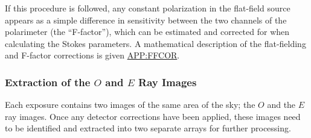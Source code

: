 If this procedure is followed, any constant polarization in the
flat-field source appears as a simple difference in sensitivity between
the two channels of the polarimeter (the ``F-factor''), which can be
estimated and corrected for when calculating the Stokes parameters.
A mathematical description of the flat-fielding and F-factor corrections
is given \hyperref{here}{in appendix }{}{APP:FFCOR}.

\subsubsection{Extraction of the $O$ and $E$ Ray Images}
Each exposure contains two images of the same area of the sky; the $O$
and the $E$ ray images. Once any detector corrections have been applied,
these images need to be identified and extracted into two separate arrays for
further processing.

